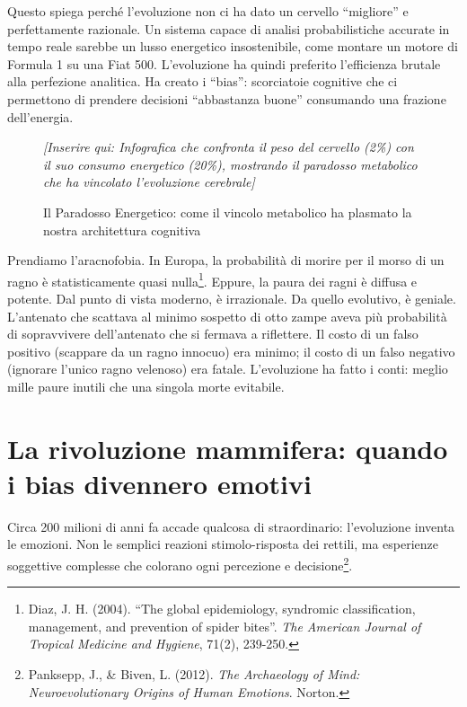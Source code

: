 Questo spiega perché l'evoluzione non ci ha dato un cervello ``migliore'' e perfettamente razionale. Un sistema capace di analisi probabilistiche accurate in tempo reale sarebbe un lusso energetico insostenibile, come montare un motore di Formula 1 su una Fiat 500. L'evoluzione ha quindi preferito l'efficienza brutale alla perfezione analitica. Ha creato i ``bias'': scorciatoie cognitive che ci permettono di prendere decisioni ``abbastanza buone'' consumando una frazione dell'energia.

\begin{figure}[h]
\centering
\textit{[Inserire qui: Infografica che confronta il peso del cervello (2\%) con il suo consumo energetico (20\%), mostrando il paradosso metabolico che ha vincolato l'evoluzione cerebrale]}
\caption{Il Paradosso Energetico: come il vincolo metabolico ha plasmato la nostra architettura cognitiva}
\label{fig:paradosso_energetico}
\end{figure}

Prendiamo l'aracnofobia. In Europa, la probabilità di morire per il morso di un ragno è statisticamente quasi nulla\footnote{Diaz, J. H. (2004). ``The global epidemiology, syndromic classification, management, and prevention of spider bites''. \textit{The American Journal of Tropical Medicine and Hygiene}, 71(2), 239-250.}. Eppure, la paura dei ragni è diffusa e potente. Dal punto di vista moderno, è irrazionale. Da quello evolutivo, è geniale. L'antenato che scattava al minimo sospetto di otto zampe aveva più probabilità di sopravvivere dell'antenato che si fermava a riflettere. Il costo di un falso positivo (scappare da un ragno innocuo) era minimo; il costo di un falso negativo (ignorare l'unico ragno velenoso) era fatale. L'evoluzione ha fatto i conti: meglio mille paure inutili che una singola morte evitabile.

\section{La rivoluzione mammifera: quando i bias divennero emotivi}

Circa 200 milioni di anni fa accade qualcosa di straordinario: l'evoluzione inventa le emozioni. Non le semplici reazioni stimolo-risposta dei rettili, ma esperienze soggettive complesse che colorano ogni percezione e decisione\footnote{Panksepp, J., \& Biven, L. (2012). \textit{The Archaeology of Mind: Neuroevolutionary Origins of Human Emotions}. Norton.}.

